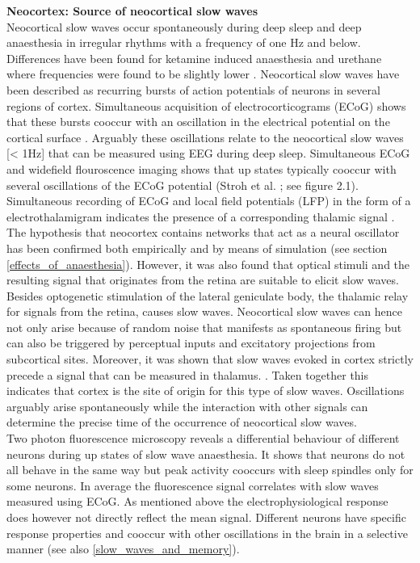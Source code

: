 \textbf{Neocortex: Source of neocortical slow waves}\\
Neocortical slow waves occur spontaneously during deep sleep and deep anaesthesia in irregular rhythms with a frequency of one Hz and below. Differences have been found for ketamine induced anaesthesia and urethane where frequencies were found to be slightly lower \parencite{steriade1993novel}. Neocortical slow waves have been described as recurring bursts of action potentials of neurons in several regions of cortex. Simultaneous acquisition of electrocorticograms (ECoG) shows that these bursts cooccur with an oscillation in the electrical potential on the cortical surface \parencite{steriade1993novel}. Arguably these oscillations relate to the neocortical slow waves [< 1Hz] that can be measured using EEG during deep sleep. Simultaneous ECoG and widefield flouroscence imaging shows that up states typically cooccur with several oscillations of the ECoG potential (Stroh et al. \cite*{stroh2013making}; see figure 2.1). \\
Simultaneous recording of ECoG and local field potentials (LFP) in the form of a electrothalamigram indicates the presence of a corresponding thalamic signal \parencite{steriade1993novel}. The hypothesis that neocortex contains networks that act as a neural oscillator has been confirmed both empirically and by means of simulation (see section \ref{effects_of_anaesthesia}). However, it was also found that optical stimuli and the resulting signal that originates from the retina are suitable to elicit slow waves. Besides optogenetic stimulation of the lateral geniculate body, the thalamic relay for signals from the retina, causes slow waves. Neocortical slow waves can hence not only arise because of random noise that manifests as spontaneous firing but can also be triggered by perceptual inputs and excitatory projections from subcortical sites. Moreover, it was shown that slow waves evoked in cortex strictly precede a signal that can be measured in thalamus. \parencite{stroh2013making}. Taken together this indicates that cortex is the site of origin for this type of slow waves. Oscillations arguably arise spontaneously while the interaction with other signals can determine the precise time of the occurrence of neocortical slow waves.\\
Two photon fluorescence microscopy reveals a differential behaviour of different neurons during up states of slow wave anaesthesia. It shows that neurons do not all behave in the same way but peak activity cooccurs with sleep spindles only for some neurons. In average the fluorescence signal correlates with slow waves measured using ECoG. As mentioned above the electrophysiological response does however not directly reflect the mean signal. Different neurons have specific response properties and cooccur with other oscillations in the brain in a selective manner (see also \ref{slow_waves_and_memory}).\\

